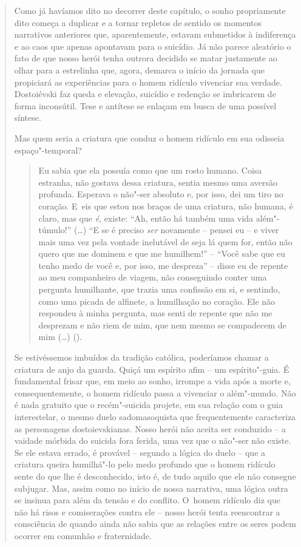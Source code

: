 {\begin{quote}
Como já havíamos dito no decorrer deste capítulo, o sonho propriamente
dito começa a duplicar e a tornar repletos de sentido os momentos
narrativos anteriores que, aparentemente, estavam submetidos à
indiferença e ao caos que apenas apontavam para o suicídio. Já não
parece aleatório o fato de que nosso herói tenha outrora decidido se
matar justamente ao olhar para a estrelinha que, agora, demarca o início
da jornada que propiciará as experiências para o homem ridículo
vivenciar sua verdade. Dostoiévski faz queda e elevação, suicídio e
redenção se imbricarem de forma inconsútil. Tese e antítese se enlaçam
em busca de uma possível síntese.

Mas quem seria a criatura que conduz o homem ridículo em sua odisseia
espaço"-temporal?

\begin{quote}
Eu sabia que ela possuía como que um rosto humano. Coisa estranha, não
gostava dessa criatura, sentia mesmo uma aversão profunda. Esperava o
não"-ser absoluto e, por isso, dei um tiro no coração. E~eis que estou
nos braços de uma criatura, não humana, é claro, mas que \emph{é},
existe: ``Ah, então há também uma vida além"-túmulo!'' (\ldots{}) ``E se
é preciso \emph{ser} novamente -- pensei eu -- e viver mais uma vez pela
vontade inelutável de seja lá quem for, então não quero que me dominem e
que me humilhem!'' -- ``Você sabe que eu tenho medo de você e, por isso,
me despreza'' -- disse eu de repente ao meu companheiro de viagem, não
conseguindo conter uma pergunta humilhante, que trazia uma confissão em
si, e sentindo, como uma picada de alfinete, a humilhação no coração.
Ele não respondeu à minha pergunta, mas senti de repente que não me
desprezam e não riem de mim, que nem mesmo se compadecem de mim
(\ldots{}) ().
\end{quote}

Se estivéssemos imbuídos da tradição católica, poderíamos chamar a
criatura de anjo da guarda. Quiçá um espírito afim -- um espírito"-guia.
É fundamental frisar que, em meio ao sonho, irrompe a vida após a morte
e, consequentemente, o homem ridículo passa a vivenciar o além"-mundo.
Não é nada gratuito que o recém"-suicida projete, em sua relação com o
guia interestelar, o mesmo duelo sadomasoquista que frequentemente
caracteriza as personagens dostoievskianas. Nosso herói não aceita ser
conduzido -- a vaidade mórbida do suicida fora ferida, uma vez que o
não"-ser não existe. Se ele estava errado, é provável -- segundo a lógica
do duelo -- que a criatura queira humilhá"-lo pelo medo profundo que o
homem ridículo sente do que lhe é desconhecido, isto é, de tudo aquilo
que ele não consegue subjugar. Mas, assim como no início de nossa
narrativa, uma lógica outra se insinua para além da tensão e do
conflito. O~homem ridículo diz que não há risos e comiserações contra
ele -- nosso herói tenta reencontrar a consciência de quando ainda não
sabia que as relações entre os seres podem ocorrer em comunhão e
fraternidade.


\end{quote}}
